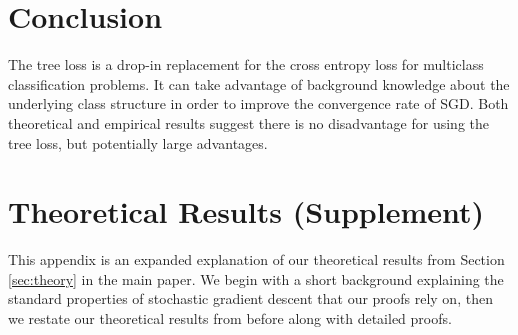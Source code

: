 \documentclass[twoside]{article}
\begin{document}
\section{Conclusion}
The tree loss is a drop-in replacement for the cross entropy loss for multiclass classification problems.
It can take advantage of background knowledge about the underlying class structure in order to improve the convergence rate of SGD.
Both theoretical and empirical results suggest there is no disadvantage for using the tree loss,
but potentially large advantages.







\clearpage
\appendix

\thispagestyle{empty}

\setcounter{lemma}{0}
\setcounter{assumption}{0}
\setcounter{corollary}{0}
\setcounter{theorem}{0}

\twocolumn[ \makesupplementtitle ]

\setcounter{lemma}{0}
\setcounter{assumption}{0}
\setcounter{corollary}{0}
\setcounter{theorem}{0}

\section{Theoretical Results (Supplement)}
\label{appendix:theory}

This appendix is an expanded explanation of our theoretical results from Section \ref{sec:theory} in the main paper.
We begin with a short background explaining the standard properties of stochastic gradient descent that our proofs rely on,
then we restate our theoretical results from before along with detailed proofs.
\end{document}

